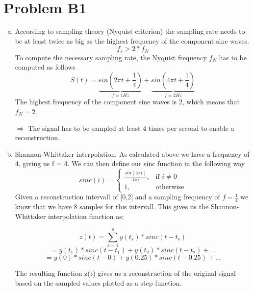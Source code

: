 \documentclass[12pt]{article}
\begin{document}
\lstset{language=C++}


\section*{Problem B1}
\begin{enumerate}[a)]
	\item According to sampling theory (Nyquist criterion) the sampling rate needs to be at least twice as big as the highest frequency of the component sine waves.
	$$ f_s > 2 * f_N$$
	To compute the necessary sampling rate, the Nyquist frequency $f_N$ has to be computed as follows
	$$ S(t) = \underbrace{sin(2\pi t + \frac{1}{4})}_{f = 1Hz} + \underbrace{sin(4\pi t + \frac{1}{4})}_{f = 2Hz}$$
	The highest frequency of the component sine waves is $2$, which means that $f_N = 2$.
	
	$\Rightarrow$ The signal has to be sampled at least 4 times per second to enable a reconstruction.
	
	\item Shannon-Whittaker interpolation:
	As calculated above we have a frequency of 4, giving us f = 4.
	We can then define our sinc function in the following way
	\[
    		sinc(i)= 
		\begin{cases}
    			 \frac{sin(4{\pi}i)}{4{\pi}i},& \text{if } i\neq 0\\
    			1,              & \text{otherwise}
		\end{cases}
	\]
    Given a reconstruction intervall of [0,2] and a sampling frequency of $f=\frac{1}{4}$ we know that we have 8 samples for this intervall. This gives us the Shannon-Whittaker interpolation function as:

	$$z(t) = \sum_{s=1}^{8} y(t_s) * sinc(t-t_s)$$
	$$=  y(t_1) * sinc(t-t_1) + y(t_2) * sinc(t-t_2) + ...$$
	$$=  y(0) * sinc(t-0) + y(0.25) * sinc(t-0.25) + ...$$
	
The resulting function {z(t)} gives us a reconstruction of the original signal based on the sampled values plotted as a step function.\\



\end{enumerate}
\end{document}
